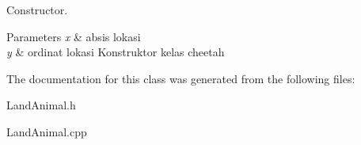 Constructor. 


\begin{DoxyParams}{Parameters}
{\em x} & absis lokasi \\
\hline
{\em y} & ordinat lokasi Konstruktor kelas cheetah \\
\hline
\end{DoxyParams}


The documentation for this class was generated from the following files\+:\begin{DoxyCompactItemize}
\item 
Land\+Animal.\+h\item 
Land\+Animal.\+cpp\end{DoxyCompactItemize}
